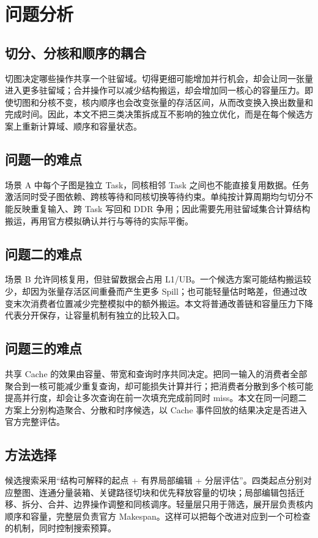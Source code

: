 \section{问题分析}
\subsection{切分、分核和顺序的耦合}
切图决定哪些操作共享一个驻留域。切得更细可能增加并行机会，却会让同一张量进入更多驻留域；合并操作可以减少结构搬运，却会增加同一核心的容量压力。即使切图和分核不变，核内顺序也会改变张量的存活区间，从而改变换入换出数量和完成时间。因此，本文不把三类决策拆成互不影响的独立优化，而是在每个候选方案上重新计算域、顺序和容量状态。

\subsection{问题一的难点}
场景 A 中每个子图是独立 Task，同核相邻 Task 之间也不能直接复用数据。任务激活同时受子图依赖、跨核等待和同核切换等待约束。单纯按计算周期均匀切分不能反映重复输入、跨 Task 写回和 DDR 争用；因此需要先用驻留域集合计算结构搬运，再用官方模拟确认并行与等待的实际平衡。

\subsection{问题二的难点}
场景 B 允许同核复用，但驻留数据会占用 L1/UB。一个候选方案可能结构搬运较少，却因为张量存活区间重叠而产生更多 Spill；也可能轻量估时略差，但通过改变末次消费者位置减少完整模拟中的额外搬运。本文将普通改善链和容量压力下降代表分开保存，让容量机制有独立的比较入口。

\subsection{问题三的难点}
共享 Cache 的效果由容量、带宽和查询时序共同决定。把同一输入的消费者全部聚合到一核可能减少重复查询，却可能损失计算并行；把消费者分散到多个核可能提高并行度，却会让多次查询在前一次填充完成前同时 miss。本文在同一问题二方案上分别构造聚合、分散和时序候选，以 Cache 事件回放的结果决定是否进入官方完整评估。

\subsection{方法选择}
候选搜索采用“结构可解释的起点 + 有界局部编辑 + 分层评估”。四类起点分别对应整图、连通分量装箱、关键路径切块和优先释放容量的切块；局部编辑包括迁移、拆分、合并、边界操作调整和同核调序。轻量层只用于筛选，展开层负责核内顺序和容量，完整层负责官方 Makespan。这样可以把每个改进对应到一个可检查的机制，同时控制搜索预算。
